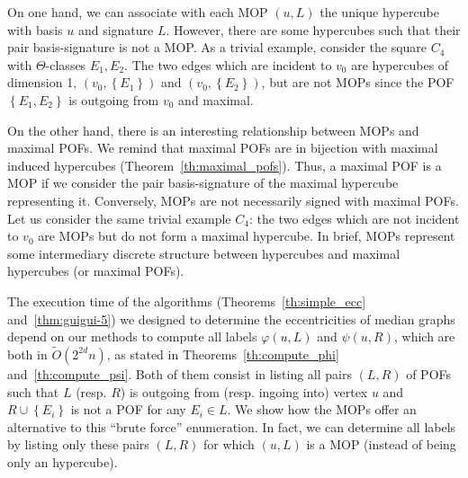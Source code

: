 \documentclass{article}
\newcommand{\set}[1]{\left\{ #1 \right\}}
\begin{document}
On one hand, we can associate with each MOP $(u,L)$ the unique hypercube with basis $u$ and signature $L$. However, there are some hypercubes such that their pair basis-signature is not a MOP. As a trivial example, consider the square $C_4$ with $\Theta$-classes $E_1,E_2$. The two edges which are incident to $v_0$ are hypercubes of dimension 1, $(v_0,\set{E_1})$ and $(v_0,\set{E_2})$, but are not MOPs since the POF $\set{E_1,E_2}$ is outgoing from $v_0$ and maximal.

On the other hand, there is an interesting relationship between MOPs and maximal POFs. We remind that maximal POFs are in bijection with maximal induced hypercubes (Theorem~\ref{th:maximal_pofs}). Thus, a maximal POF is a MOP if we consider the pair basis-signature of the maximal hypercube representing it. Conversely, MOPs are not necessarily signed with maximal POFs. Let us consider the same trivial example $C_4$: the two edges which are not incident to $v_0$ are MOPs but do not form a maximal hypercube. In brief, MOPs represent some intermediary discrete structure between hypercubes and maximal hypercubes (or maximal POFs).

The execution time of the algorithms (Theorems~\ref{th:simple_ecc} and~\ref{thm:guigui-5}) we designed to determine the eccentricities of median graphs depend on our methods to compute all labels $\varphi(u,L)$ and $\psi(u,R)$, which are both in $\tilde{O}(2^{2d}n)$, as stated in Theorems~\ref{th:compute_phi} and~\ref{th:compute_psi}. Both of them consist in listing all pairs $(L,R)$ of POFs such that $L$ (resp. $R$) is outgoing from (resp. ingoing into) vertex $u$ and $R \cup \set{E_i}$ is not a POF for any $E_i \in L$. We show how the MOPs offer an alternative to this ``brute force'' enumeration. In fact, we can determine all labels by listing only these pairs $(L,R)$ for which $(u,L)$ is a MOP (instead of being only an hypercube).
\end{document}
